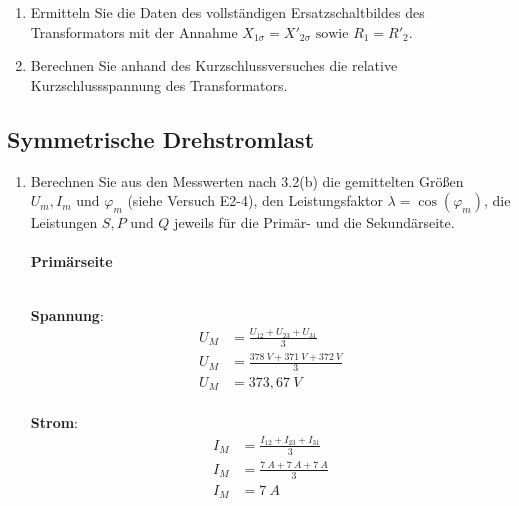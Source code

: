 \begin{enumerate}[label=\alph*)]
	\item Ermitteln Sie die Daten des vollständigen Ersatzschaltbildes des Transformators
	      mit der Annahme $X_{1\sigma} = X'_{2\sigma} \text{ sowie } R_1 = R'_2$.

	\item Berechnen Sie anhand des Kurzschlussversuches die relative Kurzschlussspannung
	      des Transformators.

\end{enumerate}
\subsection{Symmetrische Drehstromlast}
\begin{enumerate}[label=\alph*)]

	\item Berechnen Sie aus den Messwerten nach 3.2(b) die gemittelten Größen $U_m, I_m
		      \text{ und } \varphi_m$ (siehe Versuch E2-4), den Leistungsfaktor $\lambda =
		      \cos(\varphi_m)$, die Leistungen $S, P \text{ und } Q$ jeweils für die Primär-
	      und die Sekundärseite.\\ \ \\

	      \textbf{Primärseite}\\ \ \\
	      \begin{minipage}{0.5\textwidth}
		      \textbf{Spannung}:
		      \begin{align*}
			      U_M & = \frac{U_{12} + U_{23} + U_{31}}{3} \\
			      U_M & = \frac{378\ V + 371\ V + 372\ V}{3} \\
			      U_M & = 373,67\ V                          \\
		      \end{align*}
	      \end{minipage}\hfill
	      \begin{minipage}{0.5\textwidth}
		      \textbf{Strom}:
		      \begin{align*}
			      I_M & = \frac{I_{12} + I_{23} + I_{31}}{3} \\
			      I_M & = \frac{7\ A + 7\ A + 7\ A}{3}       \\
			      I_M & = 7\ A                               \\
		      \end{align*}
	      \end{minipage}


\end{enumerate}
